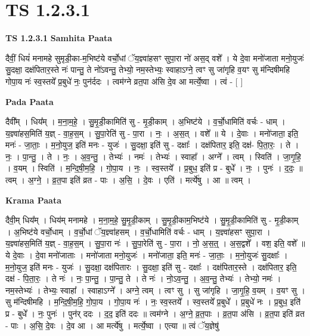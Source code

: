 \documentclass[17pt]{extarticle}
\begin{document}
\section*{ TS 1.2.3.1 }

\textbf{TS 1.2.3.1 } \newline
\textbf{Samhita Paata} \newline

दैवीं॒ धियं॑ मनामहे सुमृडी॒का-म॒भिष्ट॑ये वर्चो॒धां ॅय॒ज्ञ्वा॑हसꣳ सुपा॒रा नो॑ अस॒द् वशे᳚ । ये दे॒वा मनो॑जाता मनो॒युजः॑ सु॒दक्षा॒ दक्ष॑पितार॒स्ते नः॑ पान्तु॒ ते नो॑ऽवन्तु॒ तेभ्यो॒ नम॒स्तेभ्यः॒ स्वाहाऽग्ने॒ त्वꣳ सु जा॑गृहि व॒यꣳ सु म॑न्दिषीमहि गोपा॒य नः॑ स्व॒स्तये᳚ प्र॒बुधे॑ नः॒ पुन॑र्ददः । त्वम॑ग्ने व्रत॒पा अ॑सि दे॒व आ मर्त्ये॒ष्वा । त्वं - [ ] \newline

\textbf{Pada Paata} \newline

दैवी᳚म् । धिय᳚म् । म॒ना॒म॒हे॒ । सु॒मृ॒डी॒कामिति॑ सु - मृ॒डी॒काम् । अ॒भिष्ट॑ये । व॒र्चो॒धामिति॑ वर्चः - धाम् । य॒ज्ञ्वा॑हस॒मिति॑ य॒ज्ञ् - वा॒ह॒स॒म् । सु॒पा॒रेति॑ सु - पा॒रा । नः॒ । अ॒स॒त् । वशे᳚ ॥ ये । दे॒वाः । मनो॑जाता॒ इति॒ मनः॑ - जा॒ताः॒ । म॒नो॒युज॒ इति॑ मनः - युजः॑ । सु॒दक्षा॒ इति॑ सु - दक्षाः᳚ । दक्ष॑पितार॒ इति॒ दक्ष॑- पि॒ता॒रः॒ । ते । नः॒ । पा॒न्तु॒ । ते । नः॒ । अ॒व॒न्तु॒ । तेभ्यः॑ । नमः॑ । तेभ्यः॑ । स्वाहा᳚ । अग्ने᳚ । त्वम् । स्विति॑ । जा॒गृ॒हि॒ । व॒यम् । स्विति॑ । म॒न्दि॒षी॒म॒हि॒ । गो॒पा॒य । नः॒ । स्व॒स्तये᳚ । प्र॒बुध॒ इति॑ प्र - बुधे᳚ । नः॒ । पुनः॑ । द॒दः॒ ॥ त्वम् । अ॒ग्ने॒ । व्र॒त॒पा इति॑ व्रत - पाः । अ॒सि॒ । दे॒वः । एति॑ । मर्त्ये॑षु । आ ॥ त्वम् ।  \newline


\textbf{Krama Paata} \newline

दैवी॒म् धिय᳚म् । धिय॑म् मनामहे । म॒ना॒म॒हे॒ सु॒मृ॒डी॒काम् । सु॒मृ॒डी॒काम॒भिष्ट॑ये । सु॒मृ॒डी॒कामिति॑ सु - मृ॒डी॒काम् । अ॒भिष्ट॑ये वर्चो॒धाम् । व॒र्चो॒धां ॅय॒ज्ञ्वा॑हसम् । व॒र्चो॒धामिति॑ वर्चः - धाम् । य॒ज्ञ्वा॑हसꣳ सुपा॒रा । य॒ज्ञ्वा॑हस॒मिति॑ य॒ज्ञ् - वा॒ह॒स॒म् । सु॒पा॒रा नः॑ । सु॒पा॒रेति॑ सु - पा॒रा । नो॒ अ॒स॒त्॒ । अ॒स॒द्वशे᳚ । वश॒ इति॒ वशे᳚ ॥ ये दे॒वाः । दे॒वा मनो॑जाताः । मनो॑जाता मनो॒युजः॑ । मनो॑जाता॒ इति॒ मनः॑ - जा॒ताः॒ । म॒नो॒युजः॑ सु॒दक्षाः᳚ । म॒नो॒युज॒ इति॑ मनः - युजः॑ । सु॒दक्षा॒ दक्ष॑पितारः । सु॒दक्षा॒ इति॑ सु - दक्षाः᳚ । दक्ष॑पितार॒स्ते । दक्ष॑पितार॒ इति॒ दक्ष॑ - पि॒ता॒रः॒ । ते नः॑ । नः॒ पा॒न्तु॒ । पा॒न्तु॒ ते । ते नः॑ । नो॒ऽव॒न्तु॒ । अ॒व॒न्तु॒ तेभ्यः॑ । तेभ्यो॒ नमः॑ । नम॒स्तेभ्यः॑ । तेभ्यः॒ स्वाहा᳚ । स्वाहाऽग्ने᳚ । अग्ने॒ त्वम् । त्वꣳ सु । सु जा॑गृहि । जा॒गृ॒हि॒ व॒यम् । व॒यꣳ सु । सु म॑न्दिषीमहि । म॒न्दि॒षी॒म॒हि॒ गो॒पा॒य । गो॒पा॒य नः॑ । नः॒ स्व॒स्तये᳚ । स्व॒स्तये᳚ प्र॒बुधे᳚ । प्र॒बुधे॑ नः । प्र॒बुध॒ इति॑ प्र - बुधे᳚ । नः॒ पुनः॑ । पुन॑र् ददः । द॒द॒ इति॑ ददः ॥ त्वम॑ग्ने । अ॒ग्ने॒ व्र॒त॒पाः । व्र॒त॒पा अ॑सि । व्र॒त॒पा इति॑ व्रत - पाः । अ॒सि॒ दे॒वः । दे॒व आ । आ मर्त्ये॑षु । मर्त्ये॒ष्वा । एत्या ॥ त्वं ॅय॒ज्ञेषु॑ \newline
\end{document}
